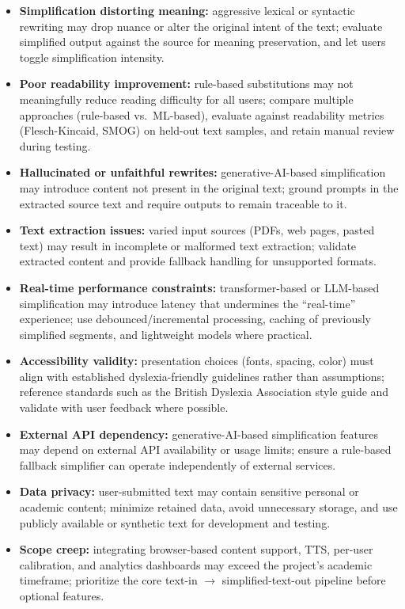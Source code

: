 \documentclass[11pt,a4paper]{article}
\begin{document}
\begin{itemize}[leftmargin=0.7cm]

    \item \textbf{Simplification distorting meaning:} aggressive lexical or syntactic rewriting may drop nuance or alter the original intent of the text; evaluate simplified output against the source for meaning preservation, and let users toggle simplification intensity.

    \item \textbf{Poor readability improvement:} rule-based substitutions may not meaningfully reduce reading difficulty for all users; compare multiple approaches (rule-based vs.\ ML-based), evaluate against readability metrics (Flesch-Kincaid, SMOG) on held-out text samples, and retain manual review during testing.

    \item \textbf{Hallucinated or unfaithful rewrites:} generative-AI-based simplification may introduce content not present in the original text; ground prompts in the extracted source text and require outputs to remain traceable to it.

    \item \textbf{Text extraction issues:} varied input sources (PDFs, web pages, pasted text) may result in incomplete or malformed text extraction; validate extracted content and provide fallback handling for unsupported formats.

    \item \textbf{Real-time performance constraints:} transformer-based or LLM-based simplification may introduce latency that undermines the ``real-time'' experience; use debounced/incremental processing, caching of previously simplified segments, and lightweight models where practical.

    \item \textbf{Accessibility validity:} presentation choices (fonts, spacing, color) must align with established dyslexia-friendly guidelines rather than assumptions; reference standards such as the British Dyslexia Association style guide and validate with user feedback where possible.

    \item \textbf{External API dependency:} generative-AI-based simplification features may depend on external API availability or usage limits; ensure a rule-based fallback simplifier can operate independently of external services.

    \item \textbf{Data privacy:} user-submitted text may contain sensitive personal or academic content; minimize retained data, avoid unnecessary storage, and use publicly available or synthetic text for development and testing.

    \item \textbf{Scope creep:} integrating browser-based content support, TTS, per-user calibration, and analytics dashboards may exceed the project's academic timeframe; prioritize the core text-in $\rightarrow$ simplified-text-out pipeline before optional features.
\end{itemize}
\end{document}
